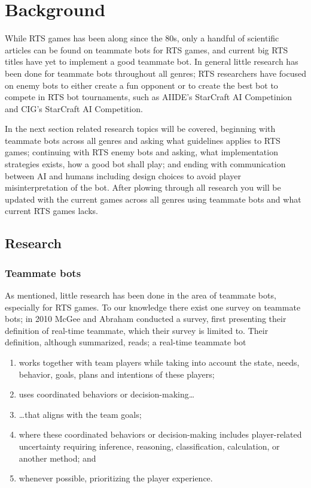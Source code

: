 \chapter{Background}
While RTS games has been along since the 80s\cite{adams06, rtsHistory}, only a handful of scientific articles can be found on teammate bots for RTS games, and current big RTS titles have yet to implement a good teammate bot. In general little research has been done for teammate bots throughout all genres; RTS researchers have focused on enemy bots to either create a fun opponent
or to create the best bot to compete in RTS bot tournaments, such as  AIIDE's StarCraft AI Competinion\cite{scaiide} and CIG's StarCraft AI Competition\cite{sccig}.

In the next section related research topics will be covered, beginning with teammate bots across all genres and asking what guidelines applies to RTS games; continuing with RTS enemy bots and asking, what implementation strategies exists, how a good bot shall play; and ending with communication between AI and humans including design choices to avoid player misinterpretation of the bot. After plowing through all research you will be updated with the current games across all genres using teammate bots and what current RTS games lacks.


\section{Research}

\subsection{Teammate bots}
As mentioned, little research has been done in the area of teammate bots, especially for RTS games. To our knowledge there exist one survey on teammate bots; in 2010 McGee and Abraham conducted a survey, first presenting their definition of real-time teammate, which their survey is limited to\cite{mcgee10}. Their definition, although summarized, reads; a real-time teammate bot
\begin{enumerate}
	\item works together with team players while taking into account the state, needs, behavior, goals, plans and intentions of these players;
	\item uses coordinated behaviors or decision-making\ldots
	\item {\ldots}that aligns with the team goals;
	\item where these coordinated behaviors or decision-making includes player-related uncertainty requiring inference, reasoning, classification, calculation, or another method; and
	\item whenever possible, prioritizing the player experience.
\end{enumerate}

